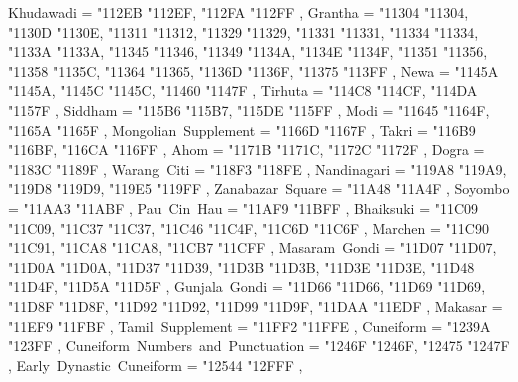 {    Khudawadi                                      = { {"112EB} {"112EF}, {"112FA} {"112FF} },
    Grantha                                        = { {"11304} {"11304}, {"1130D} {"1130E}, {"11311} {"11312}, {"11329} {"11329}, {"11331} {"11331}, {"11334} {"11334}, {"1133A} {"1133A}, {"11345} {"11346}, {"11349} {"1134A}, {"1134E} {"1134F}, {"11351} {"11356}, {"11358} {"1135C}, {"11364} {"11365}, {"1136D} {"1136F}, {"11375} {"113FF} },
    Newa                                           = { {"1145A} {"1145A}, {"1145C} {"1145C}, {"11460} {"1147F} },
    Tirhuta                                        = { {"114C8} {"114CF}, {"114DA} {"1157F} },
    Siddham                                        = { {"115B6} {"115B7}, {"115DE} {"115FF} },
    Modi                                           = { {"11645} {"1164F}, {"1165A} {"1165F} },
    Mongolian~Supplement                           = { {"1166D} {"1167F} },
    Takri                                          = { {"116B9} {"116BF}, {"116CA} {"116FF} },
    Ahom                                           = { {"1171B} {"1171C}, {"1172C} {"1172F} },
    Dogra                                          = { {"1183C} {"1189F} },
    Warang~Citi                                    = { {"118F3} {"118FE} },
    Nandinagari                                    = { {"119A8} {"119A9}, {"119D8} {"119D9}, {"119E5} {"119FF} },
    Zanabazar~Square                               = { {"11A48} {"11A4F} },
    Soyombo                                        = { {"11AA3} {"11ABF} },
    Pau~Cin~Hau                                    = { {"11AF9} {"11BFF} },
    Bhaiksuki                                      = { {"11C09} {"11C09}, {"11C37} {"11C37}, {"11C46} {"11C4F}, {"11C6D} {"11C6F} },
    Marchen                                        = { {"11C90} {"11C91}, {"11CA8} {"11CA8}, {"11CB7} {"11CFF} },
    Masaram~Gondi                                  = { {"11D07} {"11D07}, {"11D0A} {"11D0A}, {"11D37} {"11D39}, {"11D3B} {"11D3B}, {"11D3E} {"11D3E}, {"11D48} {"11D4F}, {"11D5A} {"11D5F} },
    Gunjala~Gondi                                  = { {"11D66} {"11D66}, {"11D69} {"11D69}, {"11D8F} {"11D8F}, {"11D92} {"11D92}, {"11D99} {"11D9F}, {"11DAA} {"11EDF} },
    Makasar                                        = { {"11EF9} {"11FBF} },
    Tamil~Supplement                               = { {"11FF2} {"11FFE} },
    Cuneiform                                      = { {"1239A} {"123FF} },
    Cuneiform~Numbers~and~Punctuation              = { {"1246F} {"1246F}, {"12475} {"1247F} },
    Early~Dynastic~Cuneiform                       = { {"12544} {"12FFF} },
}
